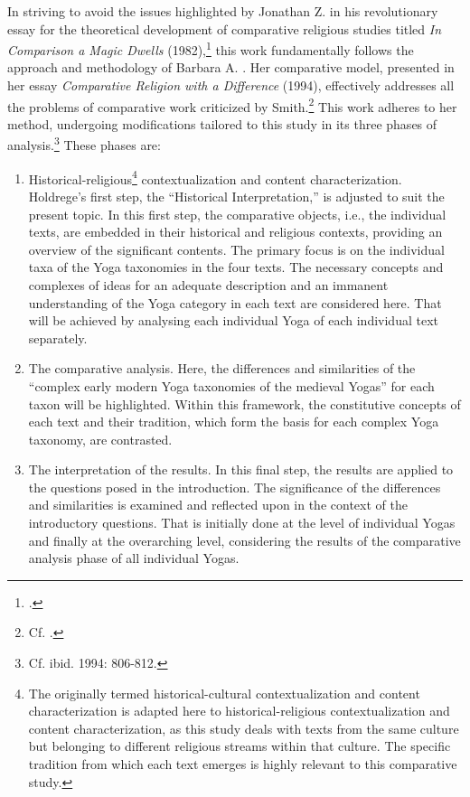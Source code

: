 In striving to avoid the issues highlighted by Jonathan Z. \citeauthor{smith1982} in his revolutionary essay for the theoretical development of comparative religious studies titled \textit{In Comparison a Magic Dwells} (1982),\footnote{\citeauthor[1982]{smith1982}.} this work fundamentally follows the approach and methodology of Barbara A. \citeauthor{holdrege1994}. Her comparative model, presented in her essay \textit{Comparative Religion with a Difference} (1994), effectively addresses all the problems of comparative work criticized by Smith.\footnote{Cf. \citeauthor[1994: 804-805]{holdrege1994}.} This work adheres to her method, undergoing modifications tailored to this study in its three phases of analysis.\footnote{Cf. ibid. 1994: 806-812.} These phases are:
\begin{enumerate}
\item Historical-religious\footnote{The originally termed historical-cultural contextualization and content characterization is adapted here to historical-religious contextualization and content characterization, as this study deals with texts from the same culture but belonging to different religious streams within that culture. The specific tradition from which each text emerges is highly relevant to this comparative study.} contextualization and content characterization. Holdrege's first step, the ``Historical Interpretation,'' is adjusted to suit the present topic. In this first step, the comparative objects, i.e., the individual texts, are embedded in their historical and religious contexts, providing an overview of the significant contents. The primary focus is on the individual taxa of the Yoga taxonomies in the four texts. The necessary concepts and complexes of ideas for an adequate description and an immanent understanding of the Yoga category in each text are considered here. That will be achieved by analysing each individual Yoga of each individual text separately.  

\item The comparative analysis. Here, the differences and similarities of the ``complex early modern Yoga taxonomies of the medieval Yogas'' for each taxon will be highlighted. Within this framework, the constitutive concepts of each text and their tradition, which form the basis for each complex Yoga taxonomy, are contrasted.

\item The interpretation of the results. In this final step, the results are applied to the questions posed in the introduction. The significance of the differences and similarities is examined and reflected upon in the context of the introductory questions. That is initially done at the level of individual Yogas and finally at the overarching level, considering the results of the comparative analysis phase of all individual Yogas.
\end{enumerate}

